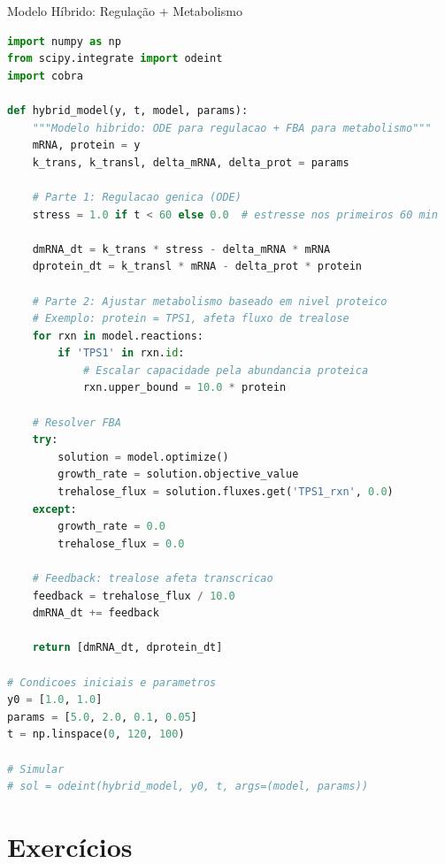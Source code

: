 \begin{frame}[fragile]{Modelo Híbrido: Regulação + Metabolismo}
\begin{lstlisting}[language=Python, caption=Modelo híbrido simples, basicstyle=\ttfamily\scriptsize]
import numpy as np
from scipy.integrate import odeint
import cobra

def hybrid_model(y, t, model, params):
    """Modelo hibrido: ODE para regulacao + FBA para metabolismo"""
    mRNA, protein = y
    k_trans, k_transl, delta_mRNA, delta_prot = params

    # Parte 1: Regulacao genica (ODE)
    stress = 1.0 if t < 60 else 0.0  # estresse nos primeiros 60 min

    dmRNA_dt = k_trans * stress - delta_mRNA * mRNA
    dprotein_dt = k_transl * mRNA - delta_prot * protein

    # Parte 2: Ajustar metabolismo baseado em nivel proteico
    # Exemplo: protein = TPS1, afeta fluxo de trealose
    for rxn in model.reactions:
        if 'TPS1' in rxn.id:
            # Escalar capacidade pela abundancia proteica
            rxn.upper_bound = 10.0 * protein

    # Resolver FBA
    try:
        solution = model.optimize()
        growth_rate = solution.objective_value
        trehalose_flux = solution.fluxes.get('TPS1_rxn', 0.0)
    except:
        growth_rate = 0.0
        trehalose_flux = 0.0

    # Feedback: trealose afeta transcricao
    feedback = trehalose_flux / 10.0
    dmRNA_dt += feedback

    return [dmRNA_dt, dprotein_dt]

# Condicoes iniciais e parametros
y0 = [1.0, 1.0]
params = [5.0, 2.0, 0.1, 0.05]
t = np.linspace(0, 120, 100)

# Simular
# sol = odeint(hybrid_model, y0, t, args=(model, params))
\end{lstlisting}
\end{frame}

\section{Exercícios}

